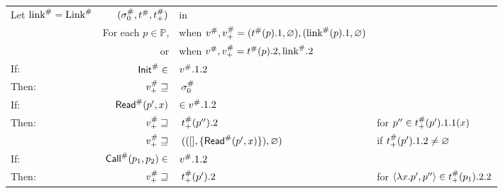 \begin{center}
  \begin{tabular}{|l@{\hskip2pt}r@{\hskip2pt}l@{\hskip2pt}l|}
    \hline
    Let ${\text{link}}^{\#}={\text{Link}}^{\#}$ & $({\sigma}^{\#}_0,{t}^{\#},{t}^{\#}_+)$ & in                                                                                  &                                                              \\
                              & For each $p\in\mathbb{P}$,             & when ${v}^{\#},{v}^{\#}_+=({t}^{\#}(p).1,\varnothing),({\text{link}}^{\#}(p).1,\varnothing)$ &                                                              \\
                              & or                                     & when ${v}^{\#},{v}^{\#}_+={t}^{\#}(p).2,{\text{link}}^{\#}.2$                                &                                                              \\
    \hline
    If:                       & ${\textsf{Init}}^{\#}\in$                        & ${v}^{\#}.1.2$                                                                       &                                                              \\
    Then:                     & ${v}^{\#}_+\sqsupseteq$                 & $\:{\sigma}^{\#}_0$                                                                      &                                                              \\
    \hline
    If:                       & ${\textsf{Read}}^{\#}(p',x)$                     & $\in{v}^{\#}.1.2$                                                                    &                                                              \\
    Then:                     & ${v}^{\#}_+\sqsupseteq$                 & $\:{t}^{\#}_+(p'').2$                                                             & for $p''\in{t}^{\#}_+(p').1.1(x)$                          \\
                              & ${v}^{\#}_+\sqsupseteq$                 & $\:(([],\{{\textsf{Read}}^{\#}(p',x)\}),\varnothing)$                                         & if ${t}^{\#}_+(p').1.2\neq\varnothing$                     \\
    \hline
    If:                       & ${\textsf{Call}}^{\#}(p_1,p_2)\in$               & ${v}^{\#}.1.2$                                                                       &                                                              \\
    Then:                     & ${v}^{\#}_+\sqsupseteq$                 & $\:{t}^{\#}_+(p').2$                                                              & for $\langle\lambda x.p',p''\rangle\in{t}^{\#}_+(p_1).2.2$ \\

\end{tabular}
\end{center}
